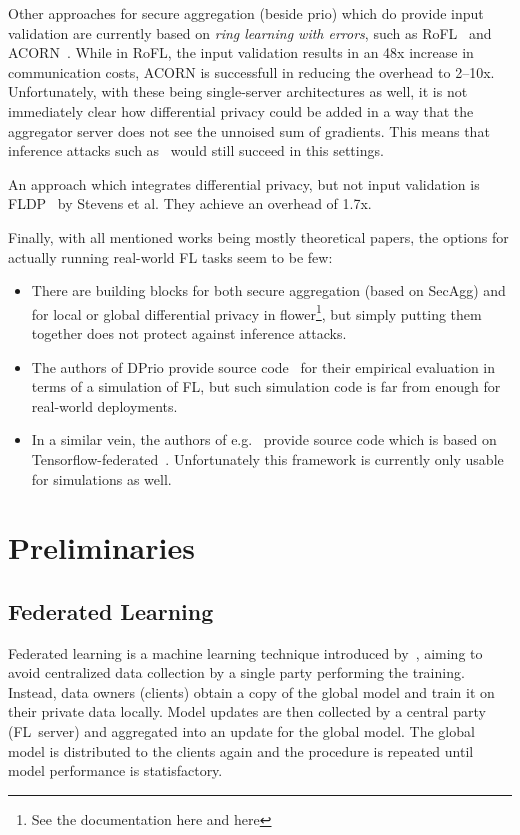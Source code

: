 \documentclass{article}
\begin{document}
Other approaches for secure aggregation (beside prio) which do provide input validation are currently based on
\textit{ring learning with errors}, such as RoFL~\cite{} and ACORN~\cite{acorn}.
While in RoFL, the input validation results in an 48x increase in communication
costs, ACORN is successfull in reducing the overhead to 2--10x. Unfortunately,
with these being single-server architectures as well, it is not immediately
clear how differential privacy could be added in a way that the aggregator
server does not see the unnoised sum of gradients. This means that inference
attacks such as~\cite{7958568} would still succeed in this settings.

An approach which integrates differential privacy, but not input validation
is FLDP~\cite{Stevens2021EfficientDP} by Stevens et al. They achieve an overhead
of 1.7x.

Finally, with all mentioned works being mostly theoretical papers, the
options for actually running real-world FL tasks seem to be few:
\begin{itemize}
  \setlength\itemsep{0em}
\item There are building blocks for both secure aggregation (based on SecAgg) and for local or
  global differential privacy in flower\footnote{See the documentation here and
    here}, but simply putting them together does not protect against inference
  attacks.
\item The authors of DPrio provide source code~\cite{} for their empirical evaluation in
  terms of a simulation of FL, but such simulation code is far from enough for
  real-world deployments.
\item In a similar vein, the authors of e.g.~\cite{Kairouz2021TheDD} provide
  source code which is based on Tensorflow-federated~\cite{}. Unfortunately this
  framework is currently only usable for simulations as well.
\end{itemize}



\section{Preliminaries}

\subsection{Federated Learning}
Federated learning is a machine learning technique introduced
by~\citet{FL}, aiming to avoid centralized data collection by a single
party performing the training. Instead, data owners (clients) obtain a copy of
the global model and train it on their private data locally. Model updates are
then collected by a central party (FL~server) and aggregated into an update for
the global model. The global model is distributed to the clients again and the
procedure is repeated until model performance is statisfactory.
\end{document}
